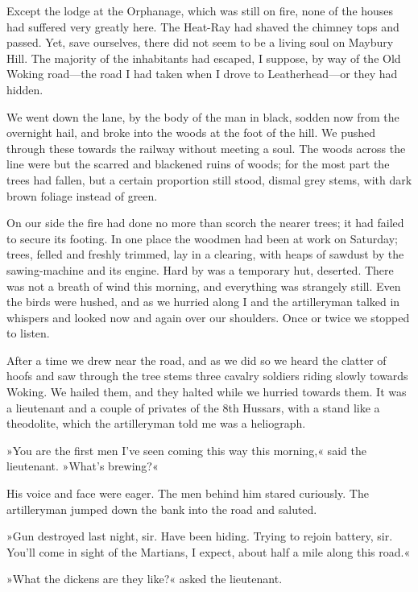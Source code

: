 Except the lodge at the Orphanage, which was still on fire, none of the houses had suffered very greatly here. The Heat-Ray had shaved the chimney tops and passed. Yet, save ourselves, there did not seem to be a living soul on Maybury Hill. The majority of the inhabitants had escaped, I suppose, by way of the Old Woking road—the road I had taken when I drove to Leatherhead—or they had hidden.




We went down the lane, by the body of the man in black, sodden now from the overnight hail, and broke into the woods at the foot of the hill. We pushed through these towards the railway without meeting a soul. The woods across the line were but the scarred and blackened ruins of woods; for the most part the trees had fallen, but a certain proportion still stood, dismal grey stems, with dark brown foliage instead of green.

On our side the fire had done no more than scorch the nearer trees; it had failed to secure its footing. In one place the woodmen had been at work on Saturday; trees, felled and freshly trimmed, lay in a clearing, with heaps of sawdust by the sawing-machine and its engine. Hard by was a temporary hut, deserted. There was not a breath of wind this morning, and everything was strangely still. Even the birds were hushed, and as we hurried along I and the artilleryman talked in whispers and looked now and again over our shoulders. Once or twice we stopped to listen.



After a time we drew near the road, and as we did so we heard the clatter of hoofs and saw through the tree stems three cavalry soldiers riding slowly towards Woking. We hailed them, and they halted while we hurried towards them. It was a lieutenant and a couple of privates of the 8th Hussars, with a stand like a theodolite, which the artilleryman told me was a heliograph.

»You are the first men I've seen coming this way this morning,« said the lieutenant. »What's brewing?«

His voice and face were eager. The men behind him stared curiously. The artilleryman jumped down the bank into the road and saluted.

»Gun destroyed last night, sir. Have been hiding. Trying to rejoin battery, sir. You'll come in sight of the Martians, I expect, about half a mile along this road.«

»What the dickens are they like?« asked the lieutenant.

